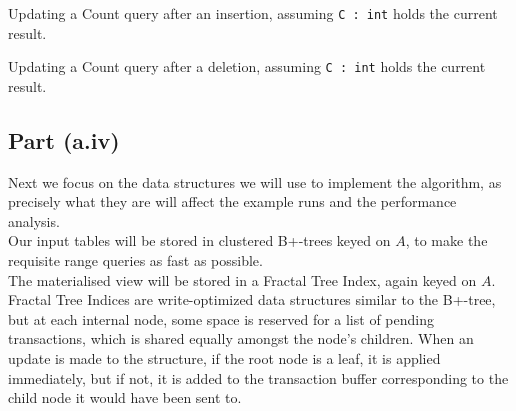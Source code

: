 \begin{algorithm}

  \caption{Updating a Count query after an insertion, assuming \texttt{C\,:\,int} holds the current result.}\label{alg:up-count-insert}
\end{algorithm}
\begin{algorithm}
  \caption{Updating a Count query after a deletion, assuming \texttt{C\,:\,int} holds the current result.}\label{alg:up-count-delete}
\end{algorithm}

\subsection{Part (a.iv)}\label{sec:q-1-a-iv}

Next we focus on the data structures we will use to implement the algorithm, as precisely what they are will affect the example runs and the performance analysis.\\[1em]

Our input tables will be stored in clustered B+-trees keyed on $A$, to make the requisite range queries as fast as possible.\\[1em]

The materialised view will be stored in a Fractal Tree Index, again keyed on $A$. Fractal Tree Indices are write-optimized data structures similar to the B+-tree, but at each internal node, some space is reserved for a list of pending transactions, which is shared equally amongst the node's children. When an update is made to the structure, if the root node is a leaf, it is applied immediately, but if not, it is added to the transaction buffer corresponding to the child node it would have been sent to.\\[1em]

